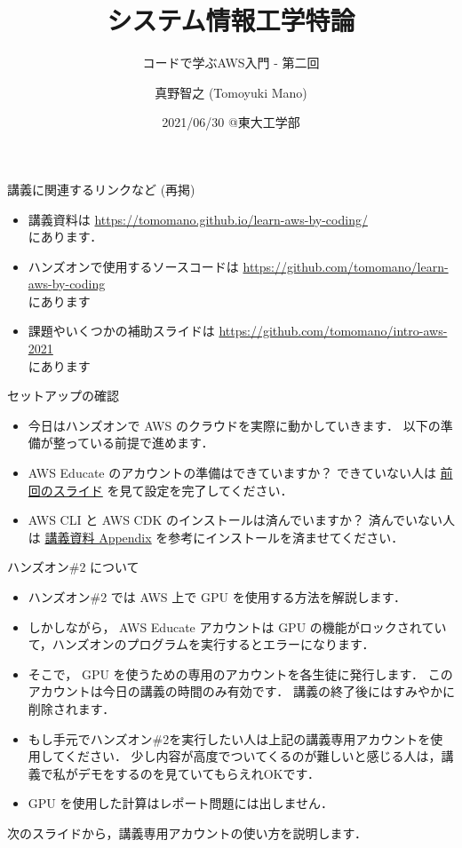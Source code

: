 \documentclass[unicode,11pt]{beamer}
\title{システム情報工学特論}
\subtitle{コードで学ぶAWS入門 - 第二回}
\author{真野智之 (Tomoyuki Mano)}
\institute[OIST]{Okinawa Institute of Science and Technology}
\date{2021/06/30 @東大工学部}
\begin{document}
\frame{\titlepage}

\begin{frame}{講義に関連するリンクなど (再掲)}
\begin{itemize}
    \item 講義資料は
    \url{https://tomomano.github.io/learn-aws-by-coding/}\\
    にあります．
    \item ハンズオンで使用するソースコードは \url{https://github.com/tomomano/learn-aws-by-coding}\\
    にあります
    \item 課題やいくつかの補助スライドは
    \url{https://github.com/tomomano/intro-aws-2021}\\
    にあります
\end{itemize}
\end{frame}

\begin{frame}{セットアップの確認}

\begin{itemize}
    \item 今日はハンズオンで AWS のクラウドを実際に動かしていきます．
    以下の準備が整っている前提で進めます．
    \item AWS Educate のアカウントの準備はできていますか？
できていない人は \href{https://github.com/tomomano/intro-aws-2021/blob/main/slides/20210623.pdf}{前回のスライド} を見て設定を完了してください．
    \item AWS CLI と AWS CDK のインストールは済んでいますか？
済んでいない人は \href{https://tomomano.github.io/learn-aws-by-coding/#_appendix}{講義資料 Appendix} を参考にインストールを済ませてください．
\end{itemize}

\end{frame}

\begin{frame}{ハンズオン\#2 について}

\begin{itemize}
    \item ハンズオン\#2 では AWS 上で GPU を使用する方法を解説します．
    \item しかしながら， AWS Educate アカウントは GPU の機能がロックされていて，ハンズオンのプログラムを実行するとエラーになります．
    \item {\color{red} そこで， GPU を使うための専用のアカウントを各生徒に発行します．
    このアカウントは今日の講義の時間のみ有効です．}
    講義の終了後にはすみやかに削除されます．
    \item もし手元でハンズオン\#2を実行したい人は上記の講義専用アカウントを使用してください．
    少し内容が高度でついてくるのが難しいと感じる人は，講義で私がデモをするのを見ていてもらえれOKです．
    \item GPU を使用した計算はレポート問題には出しません．
\end{itemize}

次のスライドから，講義専用アカウントの使い方を説明します．

\end{frame}
\end{document}
